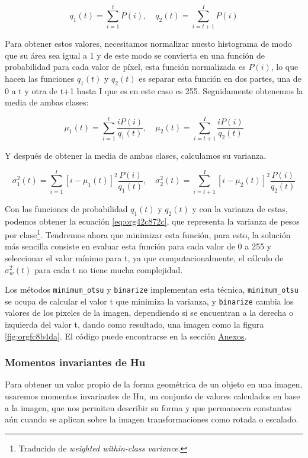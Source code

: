 \documentclass[letter]{article}
\begin{document}
$$ q_1(t) = \sum_{i=1}^t P(i), \quad q_2(t) = \sum_{i=t+1}^I P(i) $$

Para obtener estos valores, necesitamos normalizar nuesto histograma de modo que
su área sea igual a 1 y de este modo se convierta en una función de probabilidad
para cada valor de píxel, esta función normalizada es \(P(i)\), lo que hacen las
funciones \(q_1(t)\) y \(q_2(t)\) es separar esta función en dos partes, una de 0 a
t y otra de t+1 hasta I que es en este caso es 255. Seguidamente obtenemos la
media de ambas clases:

$$ \mu_1(t) = \sum_{i=1}^t \frac{i P(i)}{q_1(t)} , \quad \mu_2(t) = \sum_{i=t+1}^I \frac{i P(i)}{q_2(t)} $$

Y después de obtener la media de ambas clases, calculamos su varianza.

$$ \sigma_1^2(t) = \sum_{i=1}^t [i-\mu_1(t)]^2 \frac{P(i)}{q_1(t)} , \quad \sigma_2^2(t) = \sum_{i=t+1}^I [i-\mu_2(t)]^2 \frac{P(i)}{q_2(t)} $$

Con las funciones de probabilidad \(q_1(t)\) y \(q_2(t)\) y con la varianza de
estas, podemos obtener la ecuación \ref{eq:org42c872c}, que representa la varianza de
pesos por clase\footnote{Traducido de \emph{weighted within-class variance}.}. Tendremos ahora que minimizar esta función,
para esto, la solución más sencilla consiste en evaluar esta función para cada
valor de 0 a 255 y seleccionar el valor mínimo para t, ya que
computacionalmente, el cálculo de \(\sigma_w^2(t)\) para cada t no tiene mucha
complejidad.

Los métodos \texttt{minimum\_otsu} y \texttt{binarize} implementan esta técnica, \texttt{minimum\_otsu}
se ocupa de calcular el valor t que minimiza la varianza, y \texttt{binarize} cambia
los valores de los pixeles de la imagen, dependiendo si se encuentran a la
derecha o izquierda del valor t, dando como resultado, una imagen como la figura
\ref{fig:orgfc8b4da}. El código puede encontrarse en la sección \hyperref[sec:org2e966b8]{Anexos}.

\subsubsection{Momentos invariantes de Hu}
\label{sec:org43f61c3}
Para obtener un valor propio de la forma geométrica de un objeto en una imagen,
usaremos momentos invariantes de Hu, un conjunto de valores calculados en base a
la imagen, que nos permiten describir su forma y que permanecen constantes aún
cuando se aplican sobre la imagen transformaciones como rotada o escalado.
\end{document}
